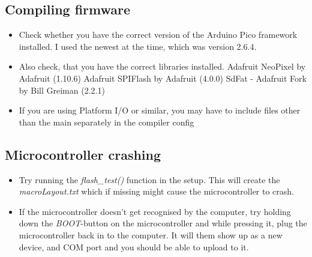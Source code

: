 \documentclass[english, 12pt]{scrartcl}
\begin{document}
	\subsection{Compiling firmware}
	\begin{itemize}
		\item Check whether you have the correct version of the Arduino Pico framework installed. I used the newest at the time, which was version 2.6.4.
		\item Also check, that you have the correct libraries installed.
		\subitem Adafruit NeoPixel by Adafruit (1.10.6)
		\subitem Adafruit SPIFlash by Adafruit (4.0.0)
		\subitem SdFat - Adafruit Fork by Bill Greiman (2.2.1)
		\item If you are using Platform I/O or similar, you may have to include files other than the main separately in the compiler config
	\end{itemize}
	\subsection{Microcontroller crashing}
	\begin{itemize}
		\item Try running the \textit{flash\_test()} function in the setup. This will create the \textit{macroLayout.txt} which if missing might cause the microcontroller to crash.
		\item If the microcontroller doesn't get recognised by the computer, try holding down the \textit{BOOT}-button on the microcontroller and while pressing it, plug the microcontroller back in to the computer. It will them show up as a new device, and COM port and you should be able to upload to it.
	\end{itemize}
\end{document}
